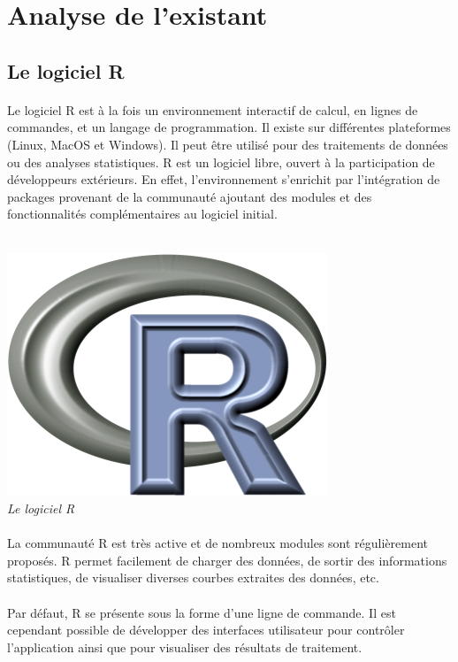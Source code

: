 \section{Analyse de l'existant}
\subsection{Le logiciel R}
\paragraph{}

Le logiciel R est à la fois un environnement interactif de calcul, en lignes de
commandes, et un langage de programmation. Il existe sur différentes plateformes
(Linux, MacOS et Windows). Il peut être utilisé pour des traitements de données
ou des analyses statistiques. R est un logiciel libre, ouvert à la participation de
développeurs extérieurs. En effet, l’environnement s’enrichit par l’intégration de
packages provenant de la communauté ajoutant des modules et des fonctionnalités
complémentaires au logiciel initial.\\\\

\begin{center}
\includegraphics[scale=0.7]{Rlogo.png}\\
\textit{Le logiciel R}
\end{center}

\paragraph{}
La communauté R est très active et de nombreux modules sont régulièrement proposés.
R permet facilement de charger des données, de sortir des informations statistiques, de visualiser
diverses courbes extraites des données, etc.
\paragraph{}
Par défaut, R se présente sous la forme d'une ligne de commande. Il est cependant possible de
développer des interfaces utilisateur pour contrôler l'application ainsi que pour visualiser des
résultats de traitement.

